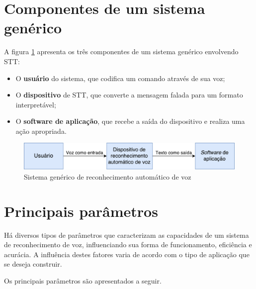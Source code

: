 
\section{Componentes de um sistema genérico}

A figura \ref{generic-stt} apresenta os três componentes de um sistema genérico envolvendo STT:

\begin{itemize}
\item O \textbf{usuário} do sistema, que codifica um comando através de sua voz;

\item O \textbf{dispositivo} de STT, que converte a mensagem falada para um formato interpretável;

\item O \textbf{software de aplicação}, que recebe a saída do dispositivo e realiza uma ação apropriada.
\end{itemize}

\begin{figure}[H]
  \centering
  \includegraphics[width=.9\textwidth]{image/generic-stt.pdf}
  \caption{Sistema genérico de reconhecimento automático de voz}
  \label{generic-stt}
\end{figure}


\section{Principais parâmetros}

Há diversos tipos de parâmetros que caracterizam as capacidades de um sistema de reconhecimento de voz, influenciando sua forma de funcionamento, eficiência e acurácia. A influência destes fatores varia de acordo com o tipo de aplicação que se deseja construir.

Os principais parâmetros são apresentados a seguir.



